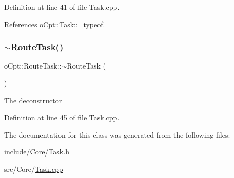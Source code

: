 Definition at line 41 of file Task.\+cpp.



References o\+Cpt\+::\+Task\+::\+\_\+typeof.

\hypertarget{classo_cpt_1_1_route_task_a036b646437996f15a9e74bc12c14aa35}{}\label{classo_cpt_1_1_route_task_a036b646437996f15a9e74bc12c14aa35} 
\subsubsection{\texorpdfstring{$\sim$\+Route\+Task()}{~RouteTask()}}
{\footnotesize\ttfamily o\+Cpt\+::\+Route\+Task\+::$\sim$\+Route\+Task (\begin{DoxyParamCaption}{ }\end{DoxyParamCaption})\hspace{0.3cm}{\ttfamily [virtual]}}

The deconstructor 

Definition at line 45 of file Task.\+cpp.



The documentation for this class was generated from the following files\+:\begin{DoxyCompactItemize}
\item 
include/\+Core/\hyperlink{_task_8h}{Task.\+h}\item 
src/\+Core/\hyperlink{_task_8cpp}{Task.\+cpp}\end{DoxyCompactItemize}
